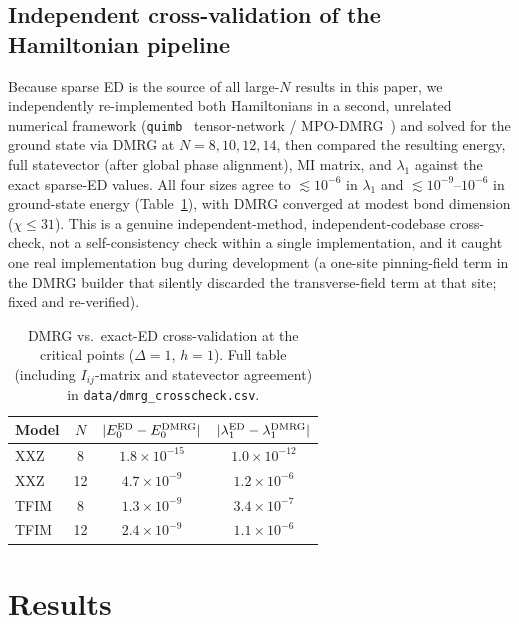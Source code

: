 \documentclass[aps,prx,reprint,amsmath,amssymb,superscriptaddress]{revtex4-2}
\begin{document}
\subsection{Independent cross-validation of the Hamiltonian pipeline}
\label{sec:dmrg-crosscheck}
Because sparse ED is the source of all large-$N$ results in this paper, we independently
re-implemented both Hamiltonians in a second, unrelated numerical framework (\texttt{quimb}~\cite{Gray2018}
tensor-network / MPO-DMRG~\cite{White1992}) and solved for the ground state via DMRG at $N=8,10,12,14$, then compared
the resulting energy, full statevector (after global phase alignment), MI matrix, and $\lambda_1$
against the exact sparse-ED values. All four sizes agree to $\lesssim 10^{-6}$ in $\lambda_1$ and
$\lesssim 10^{-9}$--$10^{-6}$ in ground-state energy (Table~\ref{tab:dmrg}), with DMRG converged at
modest bond dimension ($\chi\le 31$). This is a genuine independent-method, independent-codebase
cross-check, not a self-consistency check within a single implementation, and it caught one real
implementation bug during development (a one-site pinning-field term in the DMRG builder that
silently discarded the transverse-field term at that site; fixed and re-verified).

\begin{table}[t]
\centering
\caption{DMRG vs.\ exact-ED cross-validation at the critical points ($\Delta=1$, $h=1$). Full
table (including $I_{ij}$-matrix and statevector agreement) in \texttt{data/dmrg\_crosscheck.csv}.}
\begin{tabular}{@{}lccc@{}}
\toprule
Model & $N$ & $|E_0^{\rm ED}-E_0^{\rm DMRG}|$ & $|\lambda_1^{\rm ED}-\lambda_1^{\rm DMRG}|$ \\
\midrule
XXZ  & 8  & $1.8\times10^{-15}$ & $1.0\times10^{-12}$ \\
XXZ  & 12 & $4.7\times10^{-9}$  & $1.2\times10^{-6}$ \\
TFIM & 8  & $1.3\times10^{-9}$  & $3.4\times10^{-7}$ \\
TFIM & 12 & $2.4\times10^{-9}$  & $1.1\times10^{-6}$ \\
\bottomrule
\end{tabular}
\label{tab:dmrg}
\end{table}

\section{Results}
\label{sec:results}
\end{document}
